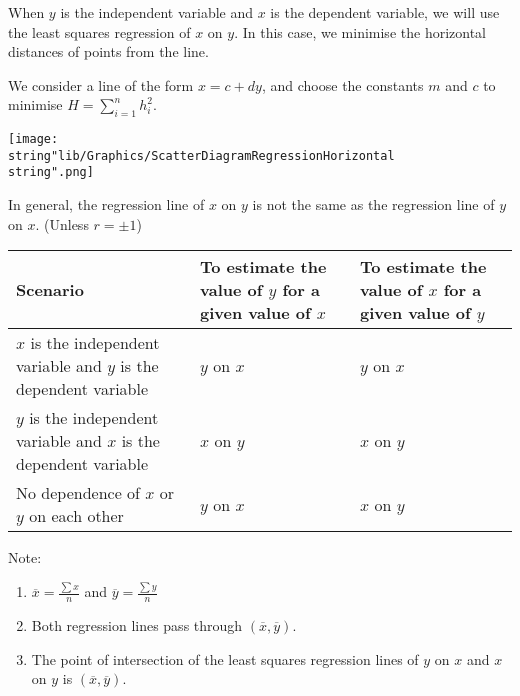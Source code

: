 \documentclass[11pt,a4paper]{book}
\begin{document}
\begin{minipage}[t]{.5\textwidth}

When $y$ is the independent variable and $x$ is the dependent variable,
we will use the least squares regression of $x$ on $y$. In this
case, we minimise the horizontal distances of points from the line.

We consider a line of the form $x=c+dy$, and choose the constants
$m$ and $c$ to minimise ${\displaystyle H=\sum_{i=1}^{n}}h_{i}^{2}$.

\end{minipage}
\begin{minipage}[t]{.5\textwidth}
\begin{center}
\texttt{[image: \\string"lib/Graphics/ScatterDiagramRegressionHorizontal\\string".png]}
\par\end{center}

\end{minipage}

In general, the regression line of $x$ on $y$ is not the same as
the regression line of $y$ on $x$. (Unless $r=\pm1$)
\begin{center}
\setlength{\extrarowheight}{2pt}%
\begin{tabular}{|>{\centering}m{5cm}|>{\centering}m{4cm}|>{\centering}m{4cm}|}
\hline
Scenario & To estimate the value of $y$ for a given value of $x$ & To estimate the value of $x$ for a given value of $y$\tabularnewline
\hline
$x$ is the independent variable and $y$ is the dependent variable & $y$ on $x$ & $y$ on $x$\tabularnewline
\hline
$y$ is the independent variable and $x$ is the dependent variable & $x$ on $y$ & $x$ on $y$\tabularnewline
\hline
No dependence of $x$ or $y$ on each other & $y$ on $x$ & $x$ on $y$\tabularnewline
\hline
\end{tabular}
\par\end{center}

Note:

\begin{enumerate}[label=(\alph*)]

\item  ${\displaystyle \overline{x}=\frac{\sum x}{n}}$ and ${\displaystyle \overline{y}=\frac{\sum y}{n}}$

\item  Both regression lines pass through $\left(\overline{x},\overline{y}\right)$.

\item  The point of intersection of the least squares regression
lines of $y$ on $x$ and $x$ on $y$ is $\left(\overline{x},\overline{y}\right)$.

\end{enumerate}
\end{document}
